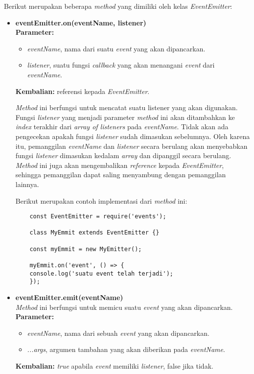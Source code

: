 Berikut merupakan beberapa \textit{method} yang dimiliki oleh kelas \textit{EventEmitter}:

\begin{itemize}
	\item \textbf{eventEmitter.on(eventName, listener)} \\ \textbf{Parameter:}
	\begin{itemize}
		\item \textit{eventName}, nama dari suatu \textit{event} yang akan dipancarkan.
		\item \textit{listener}, suatu fungsi \textit{callback} yang akan menangani \textit{event} dari \textit{eventName}. 
	\end{itemize} 
	\textbf{Kembalian:} referensi kepada \textit{EventEmitter}.
	
	\textit{Method} ini berfungsi untuk mencatat suatu listener yang akan digunakan. Fungsi \textit{listener} yang menjadi parameter \textit{method} ini akan ditambahkan ke \textit{index} terakhir dari \textit{array of listeners} pada \textit{eventName}. Tidak akan ada pengecekan apakah fungsi \textit{listener} sudah dimasukan sebelumnya. Oleh karena itu, pemanggilan \textit{eventName} dan \textit{listener} secara berulang akan menyebabkan fungsi \textit{listener} dimasukan kedalam \textit{array} dan dipanggil secara berulang. \textit{Method} ini juga akan mengembalikan \textit{reference} kepada \textit{EventEmitter}, sehingga pemanggilan dapat saling menyambung dengan pemanggilan lainnya.
	
	Berikut merupakan contoh implementasi dari \textit{method} ini:
	\begin{lstlisting}
	const EventEmitter = require('events');
	
	class MyEmmit extends EventEmitter {}
	
	const myEmmit = new MyEmitter();
	
	myEmmit.on('event', () => {
	console.log('suatu event telah terjadi');	
	});
	\end{lstlisting}
	
	\item \textbf{eventEmitter.emit(eventName)} \\ \textit{Method} ini berfungsi untuk memicu suatu \textit{event} yang akan dipancarkan. \textbf{Parameter:}
	\begin{itemize}
		\item \textit{eventName}, nama dari sebuah \textit{event} yang akan dipancarkan.
		\item \textit{...args}, argumen tambahan yang akan diberikan pada \textit{eventName}. 
	\end{itemize}
	\textbf{Kembalian:} \textit{true} apabila \textit{event} memiliki \textit{listener}, false jika tidak.
	

\end{itemize}
